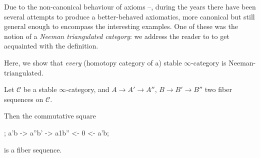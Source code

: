 \documentclass[11pt, a4paper]{amsart}
\renewcommand{\C}{\mathcal{C}}
\begin{document}
\begin{remark}
Due to the non-canonical behaviour of axioms --, during the years there have been several attempts to produce a better-behaved axiomatics, more canonical but still general enough to encompass the interesting examples. One of these was the notion of a \emph{Neeman triangulated category}: we address the reader to \cite{Neeman1991221} to get acquainted with the definition.

Here, we show that \emph{every} (homotopy category of a) stable $\infty$-category is Neeman-triangulated.
\begin{proposition}
Let $\C$ be a stable $\infty$-category, and $A\to A'\to A''$, $B\to B'\to B''$ two fiber sequences on $\C$.

Then the commutative square
\begin{center}
\begin{kD}
;
\mor a'b -> a''b' -> a1b'' <- 0 <- a'b;
\end{kD}
\end{center} 
is a fiber sequence.
\end{proposition}
\end{remark}
\end{document}
